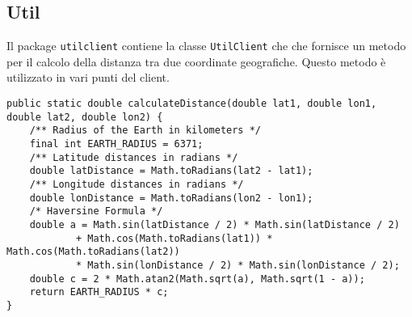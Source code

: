 \subsection{Util}
Il package \texttt{utilclient} contiene la classe \texttt{UtilClient} che
che fornisce un metodo per il calcolo della distanza tra due coordinate
geografiche. 
Questo metodo è utilizzato in vari punti del client.

\begin{verbatim}
public static double calculateDistance(double lat1, double lon1, double lat2, double lon2) {
    /** Radius of the Earth in kilometers */
    final int EARTH_RADIUS = 6371;
    /** Latitude distances in radians */
    double latDistance = Math.toRadians(lat2 - lat1);
    /** Longitude distances in radians */
    double lonDistance = Math.toRadians(lon2 - lon1);
    /* Haversine Formula */
    double a = Math.sin(latDistance / 2) * Math.sin(latDistance / 2)
            + Math.cos(Math.toRadians(lat1)) * Math.cos(Math.toRadians(lat2))
            * Math.sin(lonDistance / 2) * Math.sin(lonDistance / 2);
    double c = 2 * Math.atan2(Math.sqrt(a), Math.sqrt(1 - a));
    return EARTH_RADIUS * c;
}
\end{verbatim}
